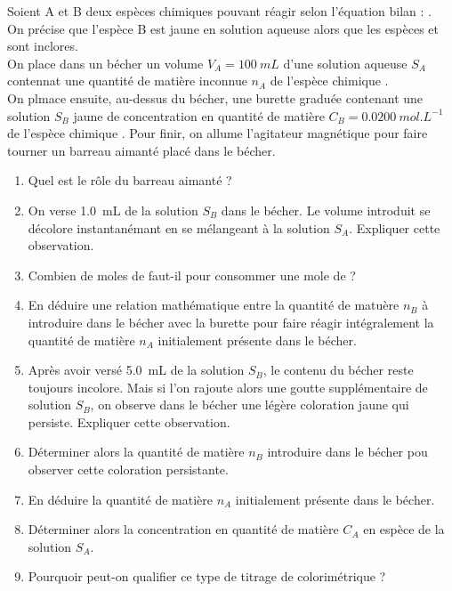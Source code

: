 \documentclass[a4paper,12pt,fleqn]{scrartcl}%
\begin{document}
\begin{exemple}
    Soient A et B deux espèces chimiques pouvant réagir selon l'équation bilan : .\\
    On précise que l'espèce B est jaune en solution aqueuse alors que les espèces  et  sont inclores.\\
    On place dans un bécher un volume $V_A = \SI{100}{mL}$ d'une solution aqueuse $S_A$ contennat une quantité de matière inconnue $n_A$ de l'espèce chimique .\\
    On plmace ensuite, au-dessus du bécher, une burette graduée contenant une solution $S_B$ jaune de concentration en quantité de matière $C_B = \SI{0,0200}{mol.L^{-1}}$ de l'espèce chimique . Pour finir, on allume l'agitateur magnétique pour faire tourner un barreau aimanté placé dans le bécher.
    \begin{enumerate}
        \item Quel est le rôle du barreau aimanté ?
        \item On verse \SI{1,0}{mL} de la solution $S_B$ dans le bécher. Le volume introduit se décolore instantanémant en se mélangeant à la solution $S_A$. Expliquer cette observation.
        \item Combien de moles de  faut-il pour consommer une mole de  ?
        \item En déduire une relation  mathématique entre la quantité de matuère $n_B$ à introduire dans le bécher avec la burette pour faire réagir intégralement la quantité de matière $n_A$ initialement présente dans le bécher.
        \item Après avoir versé \SI{5,0}{mL} de la solution $S_B$, le contenu du bécher reste toujours incolore. Mais si l'on rajoute alors une goutte supplémentaire de solution $S_B$, on observe dans le bécher une légère coloration jaune qui persiste. Expliquer cette observation.
        \item Déterminer alors la quantité de matière $n_B$ introduire dans le bécher pou observer cette coloration persistante.
        \item En déduire la quantité de matière $n_A$ initialement présente dans le bécher.
        \item Déterminer alors la concentration en quantité de matière $C_A$ en espèce  de la solution $S_A$.
        \item Pourquoir peut-on qualifier ce type de titrage de colorimétrique ?
    \end{enumerate}
\end{exemple}
\end{document}
